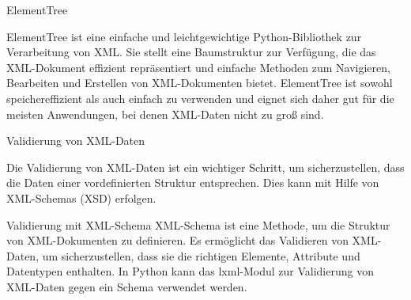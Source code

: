 ElementTree

ElementTree ist eine einfache und leichtgewichtige Python-Bibliothek zur Verarbeitung von XML. Sie stellt eine Baumstruktur zur Verfügung,
die das XML-Dokument effizient repräsentiert und einfache Methoden zum Navigieren, Bearbeiten und Erstellen von XML-Dokumenten bietet.
ElementTree ist sowohl speichereffizient als auch einfach zu verwenden und eignet sich daher gut für die meisten Anwendungen, bei denen XML-Daten nicht zu groß sind.

Validierung von XML-Daten

Die Validierung von XML-Daten ist ein wichtiger Schritt, um sicherzustellen, dass die Daten einer vordefinierten Struktur entsprechen.
Dies kann mit Hilfe von XML-Schemas (XSD) erfolgen.

Validierung mit XML-Schema
XML-Schema ist eine Methode, um die Struktur von XML-Dokumenten zu definieren.
Es ermöglicht das Validieren von XML-Daten, um sicherzustellen, dass sie die richtigen Elemente, Attribute und Datentypen enthalten.
In Python kann das lxml-Modul zur Validierung von XML-Daten gegen ein Schema verwendet werden.


\pagebreak